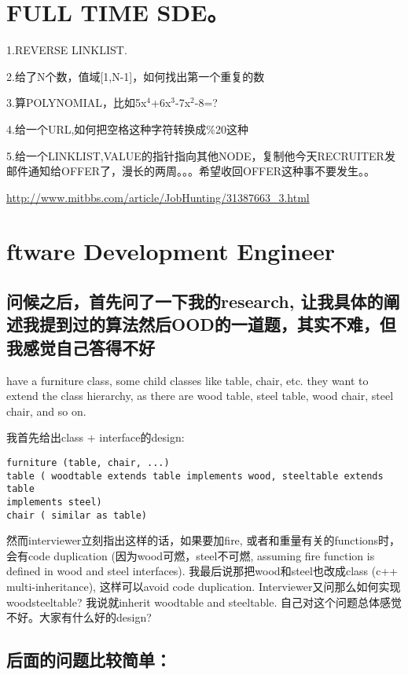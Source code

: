 \documentclass[12pt]{book}
\begin{document}
\chapter{FULL TIME SDE。}
\label{sec-23}
1.REVERSE LINKLIST.

2.给了N个数，值域[1,N-1]，如何找出第一个重复的数

3.算POLYNOMIAL，比如5x$^{\text{4}}$+6x$^{\text{3}}$-7x$^{\text{2}}$-8=?

4.给一个URL,如何把空格这种字符转换成\%20这种

5.给一个LINKLIST,VALUE的指针指向其他NODE，复制他今天RECRUITER发邮件通知给OFFER了，漫长的两周。。。希望收回OFFER这种事不要发生。。

\url{http://www.mitbbs.com/article/JobHunting/31387663_3.html}


\chapter{ftware Development Engineer}
\label{sec-24}

\section{问候之后，首先问了一下我的research, 让我具体的阐述我提到过的算法然后OOD的一道题，其实不难，但我感觉自己答得不好}
\label{sec-24-1}

have a furniture class, some child classes like table, chair, etc. they want to extend the class hierarchy, as there are wood table, steel table, wood chair, steel chair, and so on.

我首先给出class + interface的design:
\lstset{language=java,label= ,caption= ,numbers=none}
\begin{lstlisting}
furniture (table, chair, ...)
table ( woodtable extends table implements wood, steeltable extends table 
implements steel)
chair ( similar as table)
\end{lstlisting}
然而interviewer立刻指出这样的话，如果要加fire, 或者和重量有关的functions时，会有code duplication (因为wood可燃，steel不可燃, assuming fire function is defined in wood and steel interfaces). 我最后说那把wood和steel也改成class (c++ multi-inheritance), 这样可以avoid code duplication. Interviewer又问那么如何实现woodsteeltable? 我说就inherit woodtable and steeltable. 自己对这个问题总体感觉不好。大家有什么好的design?

\section{后面的问题比较简单：}
\label{sec-24-2}
\end{document}
